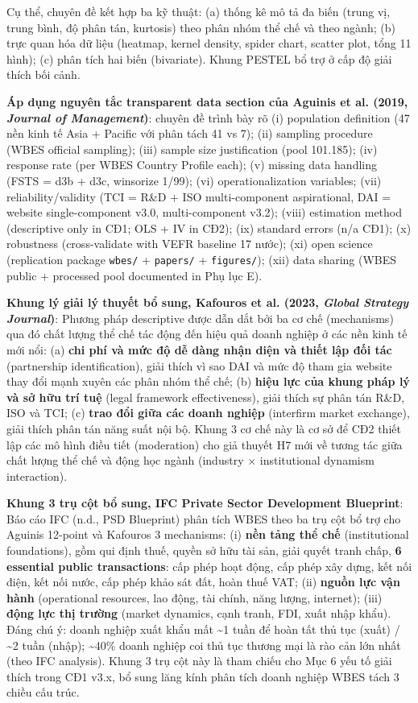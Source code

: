 \documentclass[12pt,a4paper]{article}
\begin{document}
Cụ thể, chuyên đề kết hợp ba kỹ thuật: (a) thống kê mô tả đa biến (trung
vị, trung bình, độ phân tán, kurtosis) theo phân nhóm thể chế và theo
ngành; (b) trực quan hóa dữ liệu (heatmap, kernel density, spider chart,
scatter plot, tổng 11 hình); (c) phân tích hai biến (bivariate). Khung
PESTEL bổ trợ ở cấp độ giải thích bối cảnh.

\textbf{Áp dụng nguyên tắc transparent data section của Aguinis et al.
(2019, \emph{Journal of Management})}: chuyên đề trình bày rõ (i)
population definition (47 nền kinh tế Asia + Pacific với phân tách 41 vs
7); (ii) sampling procedure (WBES official sampling); (iii) sample size
justification (pool 101.185); (iv) response rate (per WBES Country
Profile each); (v) missing data handling (FSTS = d3b + d3c, winsorize
1/99); (vi) operationalization variables; (vii) reliability/validity
(TCI = R\&D + ISO multi-component aspirational, DAI = website
single-component v3.0, multi-component v3.2); (viii) estimation method
(descriptive only in CĐ1; OLS + IV in CĐ2); (ix) standard errors (n/a
CĐ1); (x) robustness (cross-validate with VEFR baseline 17 nước); (xi)
open science (replication package \texttt{wbes/} + \texttt{papers/} +
\texttt{figures/}); (xii) data sharing (WBES public + processed pool
documented in Phụ lục E).

\textbf{Khung lý giải lý thuyết bổ sung, Kafouros et al. (2023,
\emph{Global Strategy Journal})}: Phương pháp descriptive được dẫn dắt
bởi ba cơ chế (mechanisms) qua đó chất lượng thể chế tác động đến hiệu
quả doanh nghiệp ở các nền kinh tế mới nổi: (a) \textbf{chi phí và mức
độ dễ dàng nhận diện và thiết lập đối tác} (partnership identification),
giải thích vì sao DAI và mức độ tham gia website thay đổi mạnh xuyên các
phân nhóm thể chế; (b) \textbf{hiệu lực của khung pháp lý và sở hữu trí
tuệ} (legal framework effectiveness), giải thích sự phân tán R\&D, ISO
và TCI; (c) \textbf{trao đổi giữa các doanh nghiệp} (interfirm market
exchange), giải thích phân tán năng suất nội bộ. Khung 3 cơ chế này là
cơ sở để CĐ2 thiết lập các mô hình điều tiết (moderation) cho giả thuyết
H7 mới về tương tác giữa chất lượng thể chế và động học ngành (industry
× institutional dynamism interaction).

\textbf{Khung 3 trụ cột bổ sung, IFC Private Sector Development
Blueprint}: Báo cáo IFC (n.d., PSD Blueprint) phân tích WBES theo ba trụ
cột bổ trợ cho Aguinis 12-point và Kafouros 3 mechanisms: (i)
\textbf{nền tảng thể chế} (institutional foundations), gồm qui định
thuế, quyền sở hữu tài sản, giải quyết tranh chấp, \textbf{6 essential
public transactions}: cấp phép hoạt động, cấp phép xây dựng, kết nối
điện, kết nối nước, cấp phép khảo sát đất, hoàn thuế VAT; (ii)
\textbf{nguồn lực vận hành} (operational resources, lao động, tài chính,
năng lượng, internet); (iii) \textbf{động lực thị trường} (market
dynamics, cạnh tranh, FDI, xuất nhập khẩu). Đáng chú ý: doanh nghiệp
xuất khẩu mất \textasciitilde1 tuần để hoàn tất thủ tục (xuất) /
\textasciitilde2 tuần (nhập); \textasciitilde40\% doanh nghiệp coi thủ
tục thương mại là rào cản lớn nhất (theo IFC analysis). Khung 3 trụ cột
này là tham chiếu cho Mục 6 yếu tố giải thích trong CĐ1 v3.x, bổ sung
lăng kính phân tích doanh nghiệp WBES tách 3 chiều cấu trúc.
\end{document}
